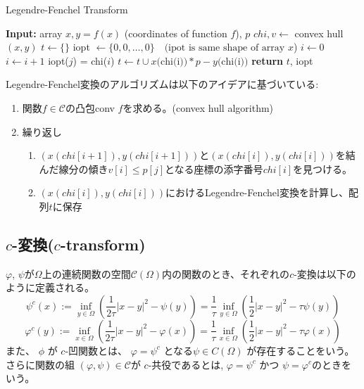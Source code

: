\begin{algorithm}[tb]
    \caption{Legendre-Fenchel Transform}
    \label{al:legendre}
    \begin{algorithmic}[1]
        \State \textbf{Input:} array $x, y = f(x)$ (coordinates of function $f$), $p$
        \State $chi, v \gets$ convex hull$(x, y) $
        \State $t \gets \{\}$
        \State iopt $\gets \{0,0, \dots, 0\} \quad \text{(ipot is same shape of array } x$) 
        \State $i \gets 0$
                \State $i \gets i + 1$
            \EndWhile
            \State iopt($j$) = chi($i$)
            \State $t \gets t \cup x(\text{chi}($i$)) * p - y(\text{chi}($i$))$
        \EndFor
        \State \textbf{return} $t$, iopt
    \end{algorithmic}
\end{algorithm}

Legendre-Fenchel変換のアルゴリズムは以下のアイデアに基づいている:
\begin{enumerate}
    \item 関数$f \in \mathcal{C}$の凸包conv $f$を求める。(convex hull algorithm)
    \item 繰り返し
    \begin{enumerate}
        \item $(x(chi[i+1]), y(chi[i+1]))$と$(x(chi[i]), y(chi[i]))$を結んだ線分の傾き$v[i] \le p[j]$となる座標の添字番号$chi[i]$を見つける。
        \item $(x(chi[i]), y(chi[i]))$におけるLegendre-Fenchel変換を計算し、配列$t$に保存
    \end{enumerate}
\end{enumerate}

\subsection{$c$-変換($c$-transform)}
\label{sect:c-変換(c-transform)}
\begin{dfn}
    $\varphi$, $\psi$が$\Omega$上の連続関数の空間$\mathcal{C}(\Omega)$内の関数のとき、それぞれの$c$-変換は以下のように定義される。
    \begin{equation}
        \label{dfn:backward-c-transform}
        \psi^c(x) := \inf_{y \in \Omega} \left( \frac{1}{2\tau}|x-y|^2 - \psi(y)\right) = \frac{1}{\tau}\inf_{y \in \Omega} \left( \frac{1}{2}|x-y|^2 - \tau\psi(y)\right)
    \end{equation}
    \begin{equation}
        \label{dfn:forward-c-transform}
        \varphi^c(y) := \inf_{x \in \Omega} \left( \frac{1}{2\tau}|x-y|^2 - \varphi(x)\right) = \frac{1}{\tau}\inf_{x \in \Omega} \left( \frac{1}{2}|x-y|^2 - \tau\varphi(x)\right)
    \end{equation}
    また、 $\phi$ が $c$-凹関数とは、 $\varphi = \psi^c$ となる$\psi \in C(\Omega)$ が存在することをいう。
    さらに関数の組 $(\varphi, \psi) \in \mathcal{C}$が $c$-共役であるとは, $\varphi = \psi^c$ かつ $\psi = \varphi^c$のときをいう。
\end{dfn}


